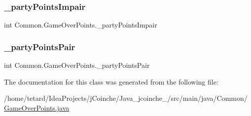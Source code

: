 \subsubsection{\texorpdfstring{\+\_\+party\+Points\+Impair}{\_partyPointsImpair}}
{\footnotesize\ttfamily int Common.\+Game\+Over\+Points.\+\_\+party\+Points\+Impair}

\mbox{\label{classCommon_1_1GameOverPoints_ac9113051b20fd8ee19d3750ca473f84d}} 
\subsubsection{\texorpdfstring{\+\_\+party\+Points\+Pair}{\_partyPointsPair}}
{\footnotesize\ttfamily int Common.\+Game\+Over\+Points.\+\_\+party\+Points\+Pair}



The documentation for this class was generated from the following file\+:\begin{DoxyCompactItemize}
\item 
/home/tetard/\+Idea\+Projects/j\+Coinche/\+Java\+\_\+jcoinche\+\_/src/main/java/\+Common/\mbox{\hyperlink{GameOverPoints_8java}{Game\+Over\+Points.\+java}}\end{DoxyCompactItemize}
